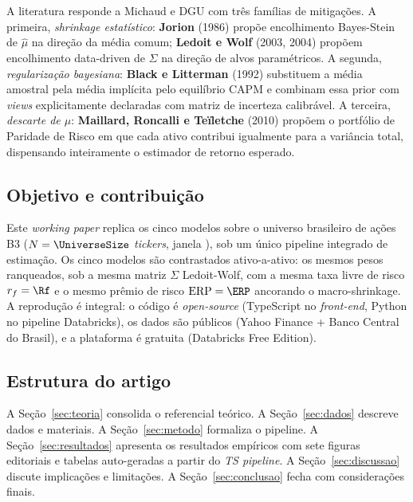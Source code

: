 \documentclass[12pt,a4paper,oneside]{article}
\begin{document}
A literatura responde a Michaud e DGU com três famílias de mitigações.
A primeira, \textit{shrinkage estatístico}: \textbf{Jorion} (1986)
propõe encolhimento Bayes-Stein de $\hat{\mu}$ na direção da
média comum; \textbf{Ledoit e Wolf} (2003, 2004) propõem encolhimento
data-driven de $\hat{\Sigma}$ na direção de alvos paramétricos. A
segunda, \textit{regularização bayesiana}: \textbf{Black e Litterman}
(1992) substituem a média amostral pela média implícita pelo
equilíbrio CAPM e combinam essa prior com \textit{views} explicitamente
declaradas com matriz de incerteza calibrável. A terceira,
\textit{descarte de $\mu$}: \textbf{Maillard, Roncalli e Teïletche}
(2010) propõem o portfólio de Paridade de Risco em que cada ativo
contribui igualmente para a variância total, dispensando inteiramente
o estimador de retorno esperado.

\subsection*{Objetivo e contribuição}

Este \textit{working paper} replica os cinco modelos sobre o universo
brasileiro de ações B3 ($N = \UniverseSize$ \textit{tickers}, janela
\UniverseDates), sob um único pipeline integrado de estimação.
Os cinco modelos são contrastados ativo-a-ativo: os mesmos pesos
ranqueados, sob a mesma matriz $\Sigma$ Ledoit-Wolf, com a mesma
taxa livre de risco $r_f = \Rf$ e o mesmo prêmio de risco $\mathrm{ERP}
= \ERP$ ancorando o macro-shrinkage. A reprodução é integral: o
código é \textit{open-source} (TypeScript no \textit{front-end},
Python no pipeline Databricks), os dados são públicos (Yahoo Finance
+ Banco Central do Brasil), e a plataforma é gratuita (Databricks
Free Edition).

\subsection*{Estrutura do artigo}

A Seção~\ref{sec:teoria} consolida o referencial teórico.
A Seção~\ref{sec:dados} descreve dados e materiais.
A Seção~\ref{sec:metodo} formaliza o pipeline.
A Seção~\ref{sec:resultados} apresenta os resultados empíricos com
sete figuras editoriais e tabelas auto-geradas a partir do
\textit{TS pipeline}.
A Seção~\ref{sec:discussao} discute implicações e limitações.
A Seção~\ref{sec:conclusao} fecha com considerações finais.

\end{document}
